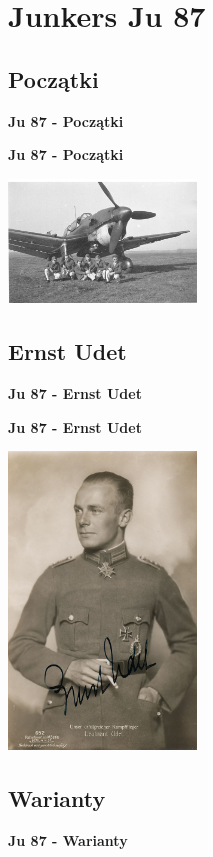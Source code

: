 \section{\textbf{Junkers Ju 87}}

\subsection{Początki}

\begin{frame}{\textbf{Ju 87 - Początki}}

\end{frame}

\begin{frame}{\textbf{Ju 87 - Początki}}
	\begin{center}
	\includegraphics[width=5cm]{images/ju87-01.jpg}
	\end{center}
\end{frame}


\subsection{Ernst Udet}

\begin{frame}{\textbf{Ju 87 - Ernst Udet}}

\end{frame}

\begin{frame}{\textbf{Ju 87 - Ernst Udet}}
	\begin{center}
	\includegraphics[width=5cm]{images/ju87-02.jpg}
	\end{center}
\end{frame}


\subsection{Warianty}

\begin{frame}{\textbf{Ju 87 - Warianty}}

\end{frame}

